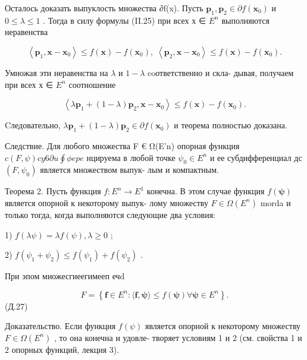 \documentclass[8pt]{extarticle}
\begin{document}
Осталось доказать выпуклость множества ∂f(x). Пусть \({\mathbf{p}}_{1},{\mathbf{p}}_{2} \in  \partial f\left( {\mathbf{x}}_{0}\right)\) и \(0 \leq  \lambda  \leq  1\) . Тогда в силу формулы (II.25) при всех х ∈ \({E}^{n}\) выполняются неравенства

\[
\left\langle  {{\mathbf{p}}_{1},\mathbf{x} - {\mathbf{x}}_{0}}\right\rangle   \leq  f\left( \mathbf{x}\right)  - f\left( {\mathbf{x}}_{0}\right) ,\;\left\langle  {{\mathbf{p}}_{2},\mathbf{x} - {\mathbf{x}}_{0}}\right\rangle   \leq  f\left( \mathbf{x}\right)  - f\left( {\mathbf{x}}_{0}\right) .
\]

Умножая эти неравенства на \(\lambda\) и \(1 - \lambda\) coответственно и скла- дывая, получаем при всех х ∈ \({E}^{n}\) соотношение

\[
\left\langle  {\lambda {\mathbf{p}}_{1} + \left( {1 - \lambda }\right) {\mathbf{p}}_{2},\mathbf{x} - {\mathbf{x}}_{0}}\right\rangle   \leq  f\left( \mathbf{x}\right)  - f\left( {\mathbf{x}}_{0}\right) .
\]

Cледовательно, \(\lambda {\mathbf{p}}_{1} + \left( {1 - \lambda }\right) {\mathbf{p}}_{2} \in  \partial f\left( {\mathbf{x}}_{0}\right)\) и теорема полностью доказана.

Следствие. Для любого множества F € Ω(E’n) опорная функция \(c\left( {F,\psi }\right) {cy6}\partial u\oint {\phi epe}\) нцируема в любой точке \({\psi }_{0} \in  {E}^{n}\) и ее субдифференциал дс \(\left( {F,{\psi }_{0}}\right)\) является множеством выпук- лым и компактным.

Теорема 2. Пусть функция \(f : {E}^{n} \rightarrow  {E}^{1}\) конечна. В этом случае функция \(f\left( \mathbf{\psi }\right)\) является опорной к некоторому выпук- лому множеству \(F \in  \Omega \left( {E}^{n}\right)\) morda и только тогда, когда выполняются следующие два условия:

1) \(f\left( {\lambda \psi }\right)  = {\lambda f}\left( \psi \right) ,\lambda  \geq  0\) ;

2) \(f\left( {{\psi }_{1} + {\psi }_{2}}\right)  \leq  f\left( {\psi }_{1}\right)  + f\left( {\psi }_{2}\right)\) .

При эпом миожесгиеегимееп ечd

\[
F = \left\{  {\mathbf{f} \in  {E}^{n} : \langle \mathbf{f},\mathbf{\psi }\rangle  \leq  f\left( \mathbf{\psi }\right) \forall \mathbf{\psi } \in  {E}^{n}}\right\}  .
\]
 (Д.27)

Доказательство. Если функция \(f\left( \psi \right)\) является опорной к некоторому множеству \(F \in  \Omega \left( {E}^{n}\right)\) , то она конечна и удовле- творяет условиям 1 и 2 (см. свойства 1 и 2 опорных функций, лекция 3).
\end{document}
